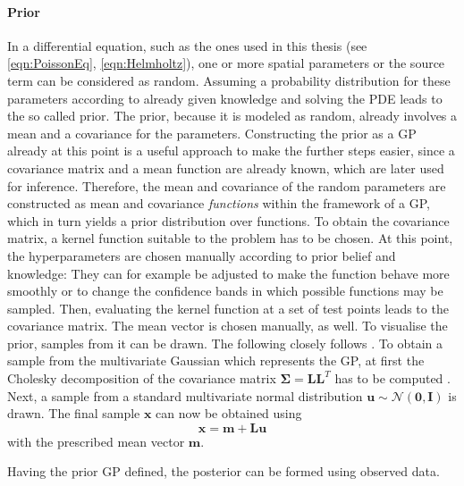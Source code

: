 \documentclass[%
  a4paper,oneside,%
  11pt,%
  smallchapters,
  style=printdev,
  extramargin,
  green,%
  rgb, <cmyk>
  ]{tubsbook}
\begin{document}
\paragraph{Prior}
In a differential equation, such as the ones used in this thesis (see \eqref{eqn:PoissonEq}, \eqref{eqn:Helmholtz}), one or more spatial parameters or the source term can be considered as random. Assuming a probability distribution for these parameters according to already given knowledge and solving the PDE leads to the so called prior. The prior, because it is modeled as random, already involves a mean and a covariance for the parameters. Constructing the prior as a GP already at this point is a useful approach to make the further steps easier, since a covariance matrix and a mean function are already known, which are later used for inference. Therefore, the mean and covariance of the random parameters are constructed as mean and covariance \emph{functions} within the framework of a GP, which in turn yields a prior distribution over functions. To obtain the covariance matrix, a kernel function suitable to the problem has to be chosen. At this point, the hyperparameters are chosen manually according to prior belief and knowledge: They can for example be adjusted to make the function behave more smoothly or to change the confidence bands in which possible functions may be sampled. Then, evaluating the kernel function at a set of test points leads to the covariance matrix. The mean vector is chosen manually, as well.
To visualise the prior, samples from it can be drawn.
The following closely follows \cite[A2]{rasmussen2006}.
To obtain a sample from the multivariate Gaussian which represents the GP, at first the Cholesky decomposition of the covariance matrix $\bm{\Sigma} = \bm{L}\bm{L}^T$ has to be computed \cite[p. 29]{girolami2021}. Next, a sample from a standard multivariate normal distribution $\bm{u} \sim \mathcal{N} (\bm{0},\bm{I})$ is drawn. The final sample $\bm{x}$ can now be obtained using
\begin{equation}
\bm{x} = \bm{m} + \bm{L} \bm{u} 
\end{equation}
with the prescribed mean vector $\bm{m}$.

Having the prior GP defined, the posterior can be formed using observed data.
	
	
\end{document}
